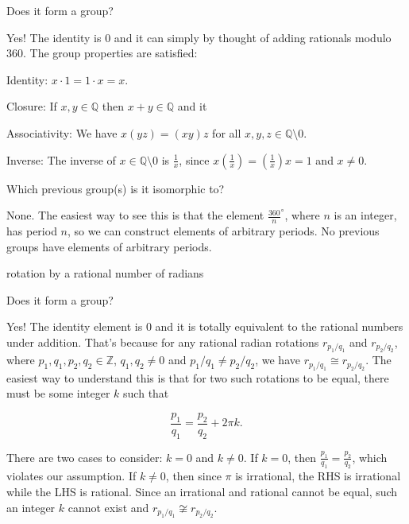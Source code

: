 \documentclass[../key.tex]{subfiles}
\begin{document}
\begin{iinner_problem}[start=1]
\item Does it form a group?
\end{iinner_problem}

\noindent Yes! The identity is $0$ and it can simply by thought of adding rationals modulo $360$. The group properties are satisfied:

Identity: $x\cdot 1=1\cdot x=x$.

Closure: If $x,y\in\mathbb{Q}$ then $x+y\in \mathbb{Q}$ and it

Associativity: We have $x(yz)=(xy)z$ for all $x,y,z \in \mathbb{Q} \setminus {0}$.

Inverse: The inverse of $x\in \mathbb{Q} \setminus {0}$ is $\frac{1}{x}$, since $x\left(\frac{1}{x}\right)=\left(\frac{1}{x}\right)x=1$ and $x\neq 0$.

\begin{iinner_problem}
\item Which previous group(s) is it isomorphic to?
\end{iinner_problem}

\noindent None. The easiest way to see this is that the element $\frac{360}{n}^\circ$, where $n$ is an integer, has period $n$, so we can construct elements of arbitrary periods. No previous groups have elements of arbitrary periods.

\begin{inner_problem}
\item rotation by a rational number of radians
\end{inner_problem}

\begin{iinner_problem}[start=1]
\item Does it form a group?
\end{iinner_problem}

\noindent Yes! The identity element is $0$ and it is totally equivalent to the rational numbers under addition. That's because for any rational radian rotations $r_{p_1/q_1}$ and $r_{p_2/q_2}$, where $p_1,q_1,p_2,q_2\in \mathbb{Z}$, $q_1,q_2\neq 0$ and $p_1/q_1\neq p_2/q_2$, we have $r_{p_1/q_1}\cong r_{p_2/q_2}$. The easiest way to understand this is that for two such rotations to be equal, there must be some integer $k$ such that

$$\frac{p_1}{q_1} = \frac{p_2}{q_2} + 2\pi k.$$

\noindent There are two cases to consider: $k=0$ and $k\neq 0$. If $k=0$, then $\frac{p_1}{q_1} = \frac{p_2}{q_2}$, which violates our assumption. If $k\neq 0$, then since $\pi$ is irrational, the RHS is irrational while the LHS is rational. Since an irrational and rational cannot be equal, such an integer $k$ cannot exist and $r_{p_1/q_1}\not\cong r_{p_2/q_2}$.
\end{document}
